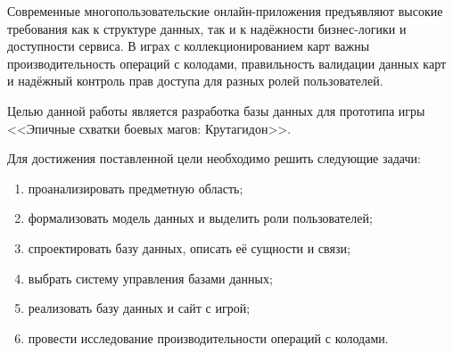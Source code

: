 
Современные многопользовательские онлайн-приложения предъявляют высокие
требования
как к структуре данных, так и к надёжности бизнес-логики и доступности сервиса.
В играх с коллекционированием карт важны производительность операций с
колодами,
правильность валидации данных карт и надёжный контроль прав доступа для разных
ролей
пользователей.

Целью данной работы является разработка базы данных для прототипа игры
<<Эпичные
схватки боевых магов: Крутагидон>>.

Для достижения поставленной цели необходимо решить следующие задачи:

\begin{enumerate}
	\item проанализировать предметную область;
	\item формализовать модель данных и выделить роли пользователей;
	\item спроектировать базу данных, описать её сущности и связи;
	\item выбрать систему управления базами данных;
	\item реализовать базу данных и сайт с игрой;
	\item провести исследование производительности операций с колодами.
\end{enumerate}

\clearpage
